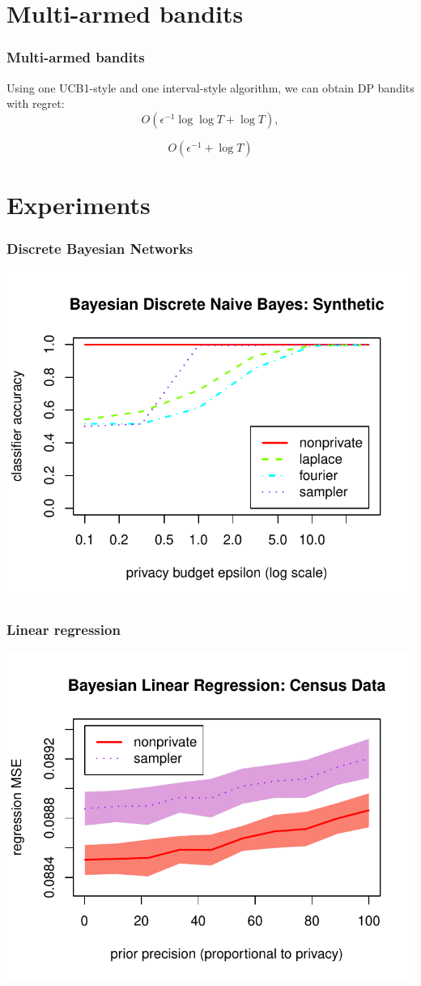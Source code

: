\section{Multi-armed bandits}
\begin{frame}
  \frametitle{Multi-armed bandits}
  Using one UCB1-style and one interval-style algorithm, we can obtain DP bandits with regret:
  \[
  O(\epsilon^{-1} \log \log T + \log T), \tag{DP-UCB}
  \]

  \[
  O(\epsilon^{-1} + \log T) \tag{DP-UCB-INT}
  \]
\end{frame}

\section{Experiments}
\begin{frame}
  \frametitle{Discrete Bayesian Networks}
  \includegraphics[width=0.95\linewidth]{figures/DNB_16_var-accuracy-eps}
\end{frame}

\begin{frame}
  \frametitle{Linear regression}
  \includegraphics[width=0.95\linewidth]{figures/lr-mse-samplerate.pdf}
\end{frame}

